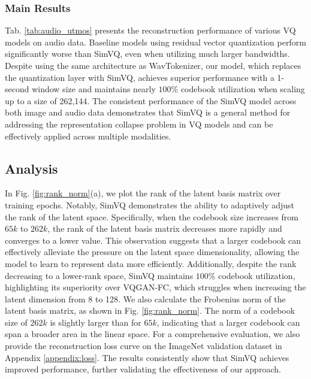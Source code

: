\subsubsection{Main Results}
Tab. \ref{tab:audio_utmos} presents the reconstruction performance of various VQ models on audio data. Baseline models using residual vector quantization perform significantly worse than SimVQ, even when utilizing much larger bandwidths. Despite using the same architecture as WavTokenizer, our model, which replaces the quantization layer with SimVQ, achieves superior performance with a 1-second window size and maintains nearly $100\%$ codebook utilization when scaling up to a size of 262,144. The consistent performance of the SimVQ model across both image and audio data demonstrates that SimVQ is a general method for addressing the representation collapse problem in VQ models and can be effectively applied across multiple modalities.



\subsection{Analysis}

In Fig. \ref{fig:rank_norm}(a), we plot the rank of the latent basis matrix over training epochs. Notably, SimVQ demonstrates the ability to adaptively adjust the rank of the latent space. Specifically, when the codebook size increases from $65k$ to $262k$, the rank of the latent basis matrix decreases more rapidly and converges to a lower value. This observation suggests that a larger codebook can effectively alleviate the pressure on the latent space dimensionality, allowing the model to learn to represent data more efficiently. Additionally, despite the rank decreasing to a lower-rank space, SimVQ maintains $100\%$ codebook utilization, highlighting its superiority over VQGAN-FC, which struggles when increasing the latent dimension from 8 to 128.
We also calculate the Frobenius norm of the latent basis matrix, as shown in Fig. \ref{fig:rank_norm}. The norm of a codebook size of $262k$ is slightly larger than for $65k$, indicating that a larger codebook can span a broader area in the linear space.
For a comprehensive evaluation, we also provide the reconstruction loss curve on the ImageNet validation dataset in Appendix \ref{appendix:loss}. The results consistently show that SimVQ achieves improved performance, further validating the effectiveness of our approach.



